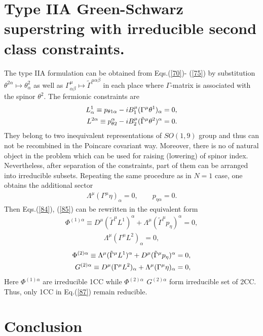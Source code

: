 \documentclass[a4paper]{article}
\begin{document}
\section{Type IIA Green-Schwarz superstring with irreducible second 
class constraints.}

The type IIA formulation can be obtained from Eqs.(\ref{70})-
(\ref{75}) by substitution $\theta^{2\alpha}\mapsto\theta^2_\alpha$ 
as well as $\Gamma^\mu_{\alpha\beta}\mapsto
\tilde\Gamma^{\mu\alpha\beta}$ in each place where $\Gamma$-matrix 
is associated with the spinor $\theta^2$. The fermionic constraints are 
\begin{eqnarray}\label{84}
L^1_\alpha\equiv p_{\theta 1\alpha}-iB_1^\mu
(\Gamma^\mu\theta^1)_\alpha=0, \cr
L^{2\alpha}\equiv p_{\theta 2}^\alpha-iB_2^\mu
(\tilde\Gamma^\mu\theta^2)^\alpha=0. 
\end{eqnarray}
They belong to two inequivalent representations of $SO(1, 9)$ group 
and thus can not be recombined in the Poincare covariant way. 
Moreover, there is no of natural object in the problem which can be 
used for raising (lowering) of spinor index. Nevertheless, after 
separation of the constraints, part of them can be arranged into 
irreducible subsets. Repeating the same procedure as in $N=1$ case, 
one obtains the additional sector 
\begin{eqnarray}\label{85}
\Lambda^\mu(\Gamma^\mu\eta)_\alpha=0, \qquad p_{\eta\alpha}=0.
\end{eqnarray}
Then Eqs.(\ref{84}), (\ref{85}) can be rewritten in the equivalent form 
\begin{eqnarray}\label{86}
\Phi^{(1)\alpha}\equiv
D^\mu(\tilde\Gamma^\mu L^1)^\alpha+
\Lambda^\mu(\tilde\Gamma^\mu p_\eta)^\alpha=0,
\end{eqnarray}
\begin{eqnarray}\label{87}
\Lambda^\mu(\Gamma^\mu L^2)_\alpha=0,
\end{eqnarray}
\begin{eqnarray}\label{88}
\Phi^{(2)\alpha}\equiv
\Lambda^\mu(\tilde\Gamma^\mu L^1)^\alpha+
D^\mu(\tilde\Gamma^\mu p_\eta)^\alpha=0, \cr
G^{(2)\alpha}\equiv
D^\mu(\Gamma^\mu L^2)_\alpha+
\Lambda^\mu(\Gamma^\mu\eta)_\alpha=0,
\end{eqnarray}
Here $\Phi^{(1)\alpha}$ are irreducible 1CC while 
$\Phi^{(2)\alpha}\, ~ G^{(2)\alpha}$ form irreducible set of 2CC. Thus, 
only 1CC in Eq.(\ref{87}) remain reducible.

\section{Conclusion}
\end{document}
